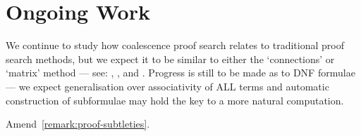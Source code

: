     \section*{Ongoing Work}
        We continue to study how coalescence proof search relates to traditional proof search methods, but we expect it to be similar to either the `connections' or `matrix' method --- see: \citet{tableaux-for-logic-of-proofs}, \citet{matrices-with-connections}, \citet{connection-based-proof-method} and \citet{proving-by-matings}.
        Progress is still to be made as to DNF formulae --- we expect generalisation over associativity of ALL terms and automatic construction of subformulae may hold the key to a more natural computation.
   
    Amend~\ref{remark:proof-subtleties}.
